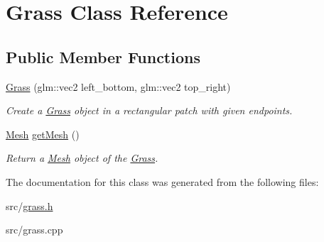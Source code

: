 \hypertarget{classGrass}{}\section{Grass Class Reference}
\label{classGrass}
\subsection*{Public Member Functions}
\begin{DoxyCompactItemize}
\item 
\hyperlink{classGrass_a9c9be303ed2dec2e9619725041e8a459}{Grass} (glm\+::vec2 left\+\_\+bottom, glm\+::vec2 top\+\_\+right)\hypertarget{classGrass_a9c9be303ed2dec2e9619725041e8a459}{}\label{classGrass_a9c9be303ed2dec2e9619725041e8a459}

\begin{DoxyCompactList}\small\item\em Create a \hyperlink{classGrass}{Grass} object in a rectangular patch with given endpoints. \end{DoxyCompactList}\item 
\hyperlink{classMesh}{Mesh} \hyperlink{classGrass_afa0cee95ad41f02c286a9c9e9f630260}{get\+Mesh} ()\hypertarget{classGrass_afa0cee95ad41f02c286a9c9e9f630260}{}\label{classGrass_afa0cee95ad41f02c286a9c9e9f630260}

\begin{DoxyCompactList}\small\item\em Return a \hyperlink{classMesh}{Mesh} object of the \hyperlink{classGrass}{Grass}. \end{DoxyCompactList}\end{DoxyCompactItemize}


The documentation for this class was generated from the following files\+:\begin{DoxyCompactItemize}
\item 
src/\hyperlink{grass_8h}{grass.\+h}\item 
src/grass.\+cpp\end{DoxyCompactItemize}
